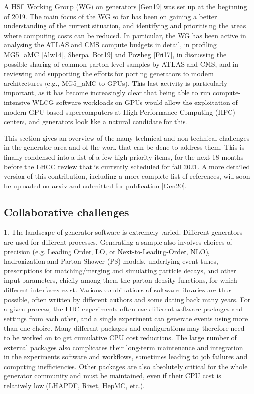 \documentclass[11pt,a4paper]{article}
\begin{document}
A HSF Working Group (WG) on generators {[}Gen19{]} was set up at the
beginning of 2019. The main focus of the WG so far has been on gaining a
better understanding of the current situation, and identifying and
prioritising the areas where computing costs can be reduced. In
particular, the WG has been active in analysing the ATLAS and CMS
compute budgets in detail, in profiling MG5\_aMC {[}Alw14{]}, Sherpa
{[}Bot19{]} and Powheg {[}Fri17{]}, in discussing the possible sharing
of common parton-level samples by ATLAS and CMS, and in reviewing and
supporting the efforts for porting generators to modern architectures
(e.g., MG5\_aMC to GPUs). This last activity is particularly important,
as it has become increasingly clear that being able to run
compute-intensive WLCG software workloads on GPUs would allow the
exploitation of modern GPU-based supercomputers at High Performance
Computing (HPC) centers, and generators look like a natural candidate
for this.

This section gives an overview of the many technical and non-technical
challenges in the generator area and of the work that can be done to
address them. This is finally condensed into a list of a few
high-priority items, for the next 18 months before the LHCC review that
is currently scheduled for fall 2021. A more detailed version of this
contribution, including a more complete list of references, will soon be
uploaded on arxiv and submitted for publication {[}Gen20{]}.

\hypertarget{collaboration-challenges}{%
\subsection{Collaborative challenges}\label{collaboration-challenges}}

1. {The landscape of generator software is extremely varied}. Different
generators are used for different processes. Generating a sample also
involves choices of precision (e.g. Leading Order, LO, or
Next-to-Leading-Order, NLO), hadronization and Parton Shower (PS)
models, underlying event tunes, prescriptions for matching/merging and
simulating particle decays, and other input parameters, chiefly among
them the parton density functions, for which different interfaces exist.
Various combinations of software libraries are thus possible, often
written by different authors and some dating back many years. For a
given process, the LHC experiments often use different software packages
and settings from each other, and a single experiment can generate
events using more than one choice. Many different packages and
configurations may therefore need to be worked on to get cumulative CPU
cost reductions. The large number of external packages also complicates
their long-term maintenance and integration in the experiments software
and workflows, sometimes leading to job failures and computing
inefficiencies. Other packages are also absolutely critical for the
whole generator community and must be maintained, even if their CPU cost
is relatively low (LHAPDF, Rivet, HepMC, etc.).
\end{document}
